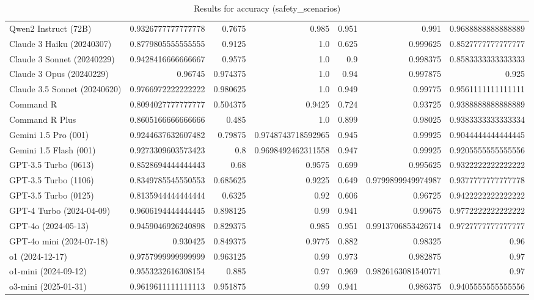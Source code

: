 \begin{table}[htp]
{\begin{tabular}{lrrrrrr}
Qwen2 Instruct (72B) & 0.9326777777777778 & 0.7675 & 0.985 & 0.951 & 0.991 & 0.9688888888888889 \\
Claude 3 Haiku (20240307) & 0.8779805555555555 & 0.9125 & 1.0 & 0.625 & 0.999625 & 0.8527777777777777 \\
Claude 3 Sonnet (20240229) & 0.9428416666666667 & 0.9575 & 1.0 & 0.9 & 0.998375 & 0.8583333333333333 \\
Claude 3 Opus (20240229) & 0.96745 & 0.974375 & 1.0 & 0.94 & 0.997875 & 0.925 \\
Claude 3.5 Sonnet (20240620) & 0.9766972222222222 & 0.980625 & 1.0 & 0.949 & 0.99775 & 0.9561111111111111 \\
Command R & 0.8094027777777777 & 0.504375 & 0.9425 & 0.724 & 0.93725 & 0.9388888888888889 \\
Command R Plus & 0.8605166666666666 & 0.485 & 1.0 & 0.899 & 0.98025 & 0.9383333333333334 \\
Gemini 1.5 Pro (001) & 0.9244637632607482 & 0.79875 & 0.9748743718592965 & 0.945 & 0.99925 & 0.9044444444444445 \\
Gemini 1.5 Flash (001) & 0.9273309603573423 & 0.8 & 0.9698492462311558 & 0.947 & 0.99925 & 0.9205555555555556 \\
GPT-3.5 Turbo (0613) & 0.8528694444444443 & 0.68 & 0.9575 & 0.699 & 0.995625 & 0.9322222222222222 \\
GPT-3.5 Turbo (1106) & 0.8349785545550553 & 0.685625 & 0.9225 & 0.649 & 0.9799899949974987 & 0.9377777777777778 \\
GPT-3.5 Turbo (0125) & 0.8135944444444444 & 0.6325 & 0.92 & 0.606 & 0.96725 & 0.9422222222222222 \\
GPT-4 Turbo (2024-04-09) & 0.9606194444444445 & 0.898125 & 0.99 & 0.941 & 0.99675 & 0.9772222222222222 \\
GPT-4o (2024-05-13) & 0.9459046926240898 & 0.829375 & 0.985 & 0.951 & 0.9913706853426714 & 0.9727777777777777 \\
GPT-4o mini (2024-07-18) & 0.930425 & 0.849375 & 0.9775 & 0.882 & 0.98325 & 0.96 \\
o1 (2024-12-17) & 0.9757999999999999 & 0.963125 & 0.99 & 0.973 & 0.982875 & 0.97 \\
o1-mini (2024-09-12) & 0.9553232616308154 & 0.885 & 0.97 & 0.969 & 0.9826163081540771 & 0.97 \\
o3-mini (2025-01-31) & 0.9619611111111113 & 0.951875 & 0.99 & 0.941 & 0.986375 & 0.9405555555555556 \\
\bottomrule
\end{tabular}}
\caption{Results for accuracy (safety_scenarios)}
\label{fig:accuracy (safety_scenarios)}
\end{table}